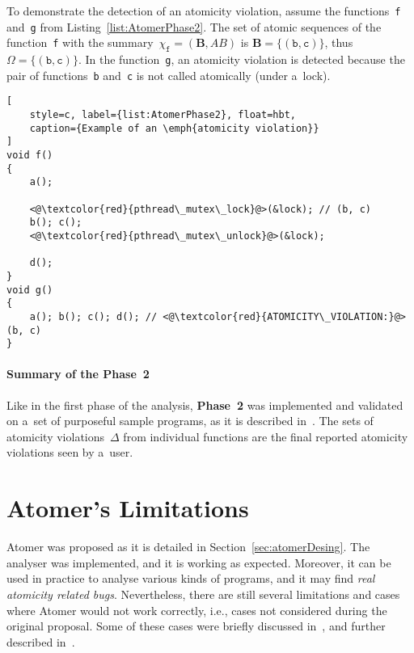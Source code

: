 \begin{example}
    To demonstrate the detection of an atomicity violation,
    assume the functions~\texttt{f} and~\texttt{g} from
    Listing~\ref{list:AtomerPhase2}. The set of atomic sequences
    of the function~\texttt{f} with the summary~$ \chi_\mathtt{f}
    = (\boldsymbol{B}, AB) $ is $ \boldsymbol{B} = {\{(\mathtt{b},
    \mathtt{c})\}} $, thus $ \Omega = {\{(\mathtt{b}, \mathtt{c})\}} $.
    In the function~\texttt{g}, an atomicity violation is detected
    because the pair of functions~\texttt{b} and~\texttt{c} is not
    called atomically (under a~lock).
\end{example}

\begin{lstlisting}[
    style=c, label={list:AtomerPhase2}, float=hbt,
    caption={Example of an \emph{atomicity violation}}
]
void f()
{
    a();

    <@\textcolor{red}{pthread\_mutex\_lock}@>(&lock); // (b, c)
    b(); c();
    <@\textcolor{red}{pthread\_mutex\_unlock}@>(&lock);

    d();
}
void g()
{
    a(); b(); c(); d(); // <@\textcolor{red}{ATOMICITY\_VIOLATION:}@> (b, c)
}
\end{lstlisting}

\paragraph{Summary of the Phase~2}

Like in the first phase of the analysis, \textbf{Phase~2} was implemented
and validated on a~set of purposeful sample programs, as it is described
in~\cite{harmimBP}. The sets of atomicity violations~$ \Delta $ from individual
functions are the final reported atomicity violations seen by a~user.


\section{Atomer's Limitations}
\label{sec:atomerLimits}

Atomer was proposed as it is detailed in Section~\ref{sec:atomerDesing}. The
analyser was implemented, and it is working as expected. Moreover, it can
be used in practice to analyse various kinds of programs, and it may find
\emph{real atomicity related bugs}. Nevertheless, there are still several
limitations and cases where Atomer would not work correctly, i.e., cases not
considered during the original proposal. Some of these cases were briefly
discussed in~\cite{harmimBP}, and further described in~\cite{excel2021Harmim}.

